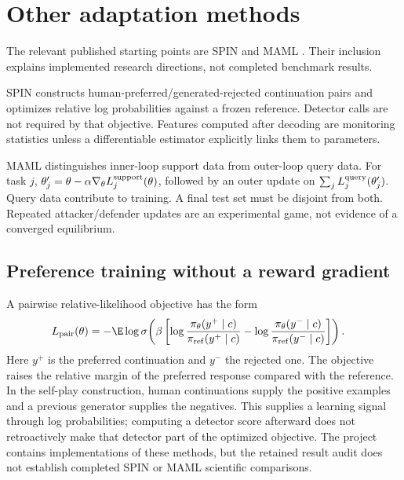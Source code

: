 \section{Other adaptation methods}
The relevant published starting points are SPIN \citep{chen2024spin} and MAML \citep{finn2017maml}. Their inclusion explains implemented research directions, not completed benchmark results.

SPIN constructs human-preferred/generated-rejected continuation pairs and optimizes relative log probabilities against a frozen reference. Detector calls are not required by that objective. Features computed after decoding are monitoring statistics unless a differentiable estimator explicitly links them to parameters.

MAML distinguishes inner-loop support data from outer-loop query data. For task $j$, $\theta'_j=\theta-\alpha\nabla_\theta L_j^{\rm support}(\theta)$, followed by an outer update on $\sum_j L_j^{\rm query}(\theta'_j)$. Query data contribute to training. A final test set must be disjoint from both. Repeated attacker/defender updates are an experimental game, not evidence of a converged equilibrium.

\subsection{Preference training without a reward gradient}
A pairwise relative-likelihood objective has the form
\begin{align}
 L_{\rm pair}(\theta)&=-\E\log\sigma\!\left(\beta\left[
 \log\frac{\pi_\theta(y^+\mid c)}{\pi_{\rm ref}(y^+\mid c)}
 -\log\frac{\pi_\theta(y^-\mid c)}{\pi_{\rm ref}(y^-\mid c)}\right]\right).
\end{align}
Here $y^+$ is the preferred continuation and $y^-$ the rejected one. The objective raises the relative margin of the preferred response compared with the reference. In the self-play construction, human continuations supply the positive examples and a previous generator supplies the negatives. This supplies a learning signal through log probabilities; computing a detector score afterward does not retroactively make that detector part of the optimized objective. The project contains implementations of these methods, but the retained result audit does not establish completed SPIN or MAML scientific comparisons.

